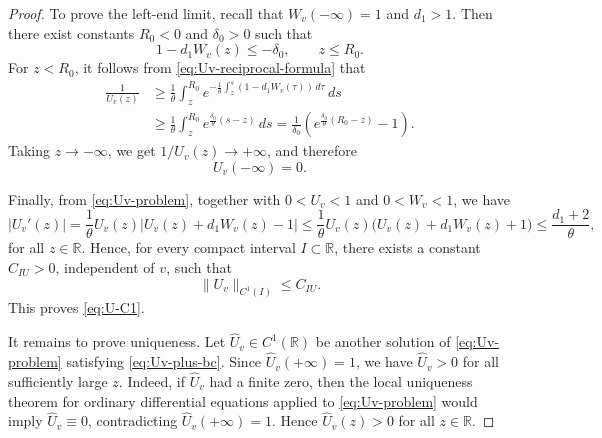 \documentclass[10pt,a4paper]{amsart}
\begin{document}
\begin{proof}
To prove the left-end limit, recall that $W_v(-\infty)=1$ and $d_1>1$. Then there exist constants $R_0<0$ and $\delta_0>0$ such that
\begin{equation*}
1-d_1W_v(z)\le-\delta_0,\qquad z\le R_0.
\end{equation*}
For $z<R_0$, it follows from \eqref{eq:Uv-reciprocal-formula} that
\begin{align*}
\frac{1}{U_v(z)}
&\ge\frac{1}{\theta}\int_z^{R_0}e^{-\frac{1}{\theta}\int_z^s(1-d_1W_v(\tau))\,d\tau}\,ds\\
&\ge\frac{1}{\theta}\int_z^{R_0}e^{\frac{\delta_0}{\theta}(s-z)}\,ds
=\frac{1}{\delta_0}\left(e^{\frac{\delta_0}{\theta}(R_0-z)}-1\right).
\end{align*}
Taking $z\to-\infty$, we get $1/U_v(z)\to+\infty$, and therefore
\begin{equation*}
U_v(-\infty)=0.
\end{equation*}

Finally, from \eqref{eq:Uv-problem}, together with $0<U_v<1$ and $0<W_v<1$, we have
\begin{equation*}
|U_v'(z)|
=\frac{1}{\theta}U_v(z)|U_v(z)+d_1W_v(z)-1|
\le\frac{1}{\theta}U_v(z)\bigl(U_v(z)+d_1W_v(z)+1\bigr)
\le\frac{d_1+2}{\theta},
\end{equation*}
for all $z\in\mathbb R$. Hence, for every compact interval $I\subset\mathbb R$, there exists a constant $C_{IU}>0$, independent of $v$, such that
\begin{equation*}
\|U_v\|_{C^1(I)}\le C_{IU}.
\end{equation*}
This proves \eqref{eq:U-C1}.

It remains to prove uniqueness. Let $\widehat U_v\in C^1(\mathbb R)$ be another solution of \eqref{eq:Uv-problem} satisfying \eqref{eq:Uv-plus-bc}. Since $\widehat U_v(+\infty)=1$, we have $\widehat U_v>0$ for all sufficiently large $z$. Indeed, if $\widehat U_v$ had a finite zero, then the local uniqueness theorem for ordinary differential equations applied to \eqref{eq:Uv-problem} would imply $\widehat U_v\equiv0$, contradicting $\widehat U_v(+\infty)=1$. Hence $\widehat U_v(z)>0$ for all $z\in\mathbb R$.


\end{proof}
\end{document}
